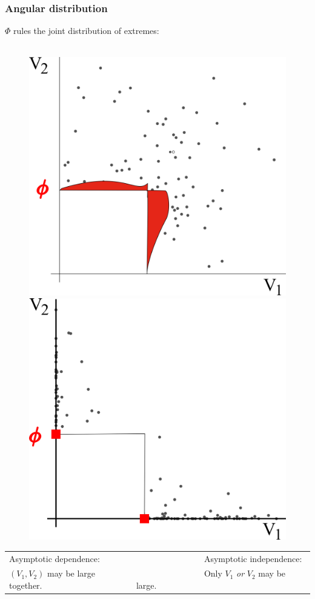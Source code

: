 \documentclass[9pt]{beamer}
\begin{document}
\begin{frame}
  \frametitle{Angular distribution}
$\Phi$ rules  the joint distribution of extremes:\\~\\
     \begin{figure}[h]
      \centering
      \includegraphics[scale=0.3]{sourcefigs/Example2D_depSquare.png}
      \includegraphics[scale=0.3]{sourcefigs/Example2D_indepSquare.png}
    \end{figure}

    \begin{tabular}{ll}
      Asymptotic dependence:  & ~~~~~~~~~~~~~~~~Asymptotic independence:\\
$(V_1,V_2)$ may be large together. & ~~~~~~~~~~~~~~~~Only $V_1$ \emph{or} $V_2$ may be large.
    \end{tabular}

\end{frame}
\end{document}

